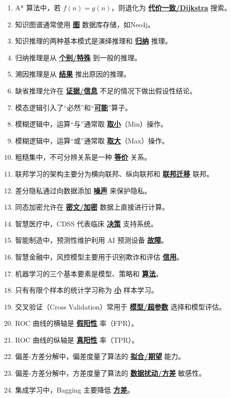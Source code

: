 \documentclass[12pt,a4paper,openany]{ctexbook}
\begin{document}
\begin{enumerate}[resume,leftmargin=2em,itemsep=1pt]
\item A* 算法中，若 $f(n)=g(n)$，则退化为 \underline{\textbf{代价一致/Dijkstra}} 搜索。
\item 知识图谱通常使用 \underline{\textbf{图}} 数据库存储，如Neo4j。
\item 知识推理的两种基本模式是演绎推理和 \underline{\textbf{归纳}} 推理。
\item 归纳推理是从 \underline{\textbf{个别/特殊}} 到一般的推理。
\item 溯因推理是从 \underline{\textbf{结果}} 推出原因的推理。
\item 缺省推理允许在 \underline{\textbf{证据/信息}} 不足的情况下做出假设性结论。
\item 模态逻辑引入了“必然”和“\underline{\textbf{可能}}”算子。
\item 模糊逻辑中，运算“与”通常取 \underline{\textbf{取小}}（Min）操作。
\item 模糊逻辑中，运算“或”通常取 \underline{\textbf{取大}}（Max）操作。
\item 粗糙集中，不可分辨关系是一种 \underline{\textbf{等价}} 关系。
\item 联邦学习的架构主要分为横向联邦、纵向联邦和 \underline{\textbf{联邦迁移}} 联邦。
\item 差分隐私通过向数据添加 \underline{\textbf{噪声}} 来保护隐私。
\item 同态加密允许在 \underline{\textbf{密文/加密}} 数据上直接进行计算。
\item 智慧医疗中，CDSS 代表临床 \underline{\textbf{决策}} 支持系统。
\item 智能制造中，预测性维护利用 AI 预测设备 \underline{\textbf{故障}}。
\item 智慧金融中，风控模型主要用于识别欺诈和评估 \underline{\textbf{信用}}。
\item 机器学习的三个基本要素是模型、策略和 \underline{\textbf{算法}}。
\item 只有有限个样本的统计学习称为 \underline{\textbf{小}} 样本学习。
\item 交叉验证（Cross Validation）常用于 \underline{\textbf{模型/超参数}} 选择和模型评估。
\item ROC 曲线的横轴是 \underline{\textbf{假阳性}} 率（FPR）。
\item ROC 曲线的纵轴是 \underline{\textbf{真阳性}} 率（TPR）。
\item 偏差-方差分解中，偏差度量了算法的 \underline{\textbf{拟合/期望}} 能力。
\item 偏差-方差分解中，方差度量了算法的 \underline{\textbf{数据扰动/方差}} 敏感性。
\item 集成学习中，Bagging 主要降低 \underline{\textbf{方差}}。

\end{enumerate}
\end{document}
